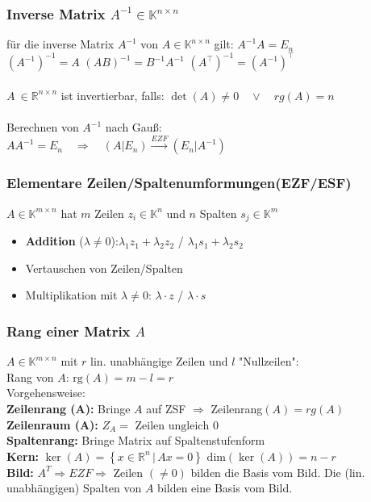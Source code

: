 \documentclass[6pt,a4paper]{scrartcl}
\newcommand{\dme}[2]{\ensuremath{\left\{#1\,\vert\,#2 \right\}}}
\newcommand{\Ra}[0]{\ensuremath{\Rightarrow}}
\begin{document}
\begin{multicols}{4}
\subsubsection{Inverse Matrix $A^{-1}\in \mathbb K^{n\times n}$}
für die inverse Matrix $A^{-1}$ von $A\in \mathbb K^{n\times n}$ gilt: $A^{-1}A=E_n$\\
$(A^{-1})^{-1}=A$ \qquad $(AB)^{-1}=B^{-1}A^{-1}$ \qquad $(A^\top)^{-1}=(A^{-1})^\top$\\
\\
$A\ \in \mathbb R^{n\times n}$ ist invertierbar, falls: $\det (A) \ne 0 \quad \lor \quad rg(A)=n$\\
\\
Berechnen von $A^{-1}$ nach Gauß:\\
$AA^{-1}=E_n\quad\Rightarrow\quad (A|E_n)\overset{EZF}{\longrightarrow}(E_n|A^{-1})$\\

\subsubsection{Elementare Zeilen/Spaltenumformungen(EZF/ESF)}
$A \in \mathbb K^{m\times n}$ hat $m$ Zeilen $z_i\in \mathbb K^n$ und $n$ Spalten $s_j\in \mathbb K^m$
\begin{itemize}\itemsep0pt
\item \textbf{Addition} ($\lambda\ne 0$):\quad $\lambda_1 z_1 + \lambda_2  z_2$ \quad / \quad $\lambda_1  s_1 + \lambda_2 s_2$
\item Vertauschen von Zeilen/Spalten
\item Multiplikation mit $\lambda\ne 0$: \quad $\lambda \cdot z$ \quad  / \quad  $\lambda \cdot s$
\end{itemize}

\subsubsection{Rang einer Matrix $A$}
$A\in \mathbb K^{m\times n}$ mit $r$ lin. unabhängige Zeilen und $l$ "Nullzeilen":\\
Rang von $A$: $\mathrm{rg}(A)=m-l=r$\\  
Vorgehensweise: \\
\textbf{Zeilenrang (A):} Bringe $A$ auf ZSF $\Ra$ Zeilenrang$(A) = rg(A)$\\     
\textbf{Zeilenraum (A):}  $Z_A = \text{ Zeilen ungleich } 0$            \\
\textbf{Spaltenrang:} Bringe Matrix auf Spaltenstufenform        \\
\textbf{Kern:  }   $\ker(A) = \dme{x \in \mathbb R^n}{Ax= 0}$ \qquad $\mathrm{dim}(\ker(A))=n-r$ \\
\textbf{Bild: } $A^T \Ra EZF \Ra $ Zeilen $(\not= 0)$ bilden die Basis vom Bild. Die (lin. unabhängigen) Spalten von $A$ bilden eine Basis vom Bild.

\end{multicols}
\end{document}
